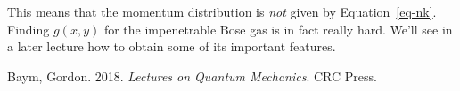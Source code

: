 \documentclass[
  letterpaper,
  DIV=11,
  numbers=noendperiod]{scrreprt}
\newlength{\cslhangindent}
\newenvironment{CSLReferences}[2] %
 {\begin{list}{}{%
  \setlength{\itemindent}{0pt}
  \setlength{\leftmargin}{0pt}
  \setlength{\parsep}{0pt}
  \ifodd #1
   \setlength{\leftmargin}{\cslhangindent}
   \setlength{\itemindent}{-1\cslhangindent}
  \fi
  \setlength{\itemsep}{#2\baselineskip}}}
 {\end{list}}
\begin{document}
This means that the momentum distribution is \emph{not} given by
Equation~\ref{eq-nk}. Finding \(g(x,y)\) for the impenetrable Bose gas
is in fact really hard. We'll see in a later lecture how to obtain some
of its important features.

\label{refs}
\begin{CSLReferences}{1}{0}
Baym, Gordon. 2018. \emph{Lectures on Quantum Mechanics}. CRC Press.

\end{CSLReferences}
\end{document}
